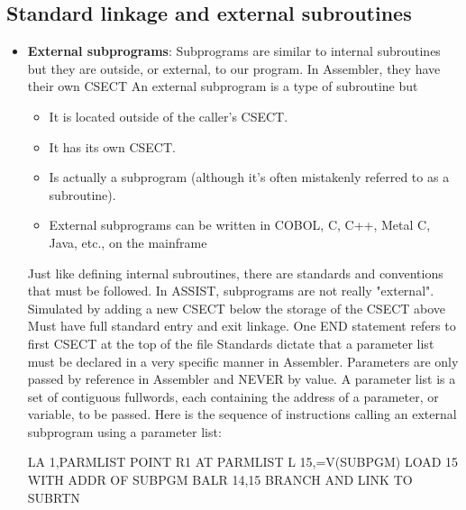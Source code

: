 \documentclass{report}
\begin{document}
    \pagebreak 
    \subsection{Standard linkage and external subroutines}
    \begin{itemize}
        \item \textbf{External subprograms}: Subprograms are similar to internal subroutines but they are outside, or external, to our program. 
            \bigbreak \noindent 
            In Assembler, they have their own CSECT
            \bigbreak \noindent 
            An external subprogram is a type of subroutine but
            \begin{itemize}
                \item It is located outside of the caller's CSECT.
                \item It has its own CSECT.
                \item Is actually a subprogram (although it's often mistakenly referred to as a subroutine).
                \item External subprograms can be written in COBOL, C, C++, Metal C, Java, etc., on the mainframe
            \end{itemize}
            \bigbreak \noindent 
            Just like defining internal subroutines, there are standards and conventions that must be followed.
            \bigbreak \noindent 
            In ASSIST, subprograms are not really "external". Simulated by adding a new CSECT below the storage of the CSECT above
            \bigbreak \noindent 
            Must have full standard entry and exit linkage. One END statement refers to first CSECT at the top of the file
            \bigbreak \noindent 
            Standards dictate that a parameter list must be declared in a very specific manner in Assembler. Parameters are only passed by reference in Assembler and NEVER by value.  A parameter list is a set of contiguous fullwords, each containing the address of a parameter, or variable, to be passed.
            \bigbreak \noindent 
            Here is the sequence of instructions calling an external subprogram using a parameter list:
            \bigbreak \noindent 
            \begin{cppcode}
                LA   1,PARMLIST    POINT R1 AT PARMLIST
                L    15,=V(SUBPGM) LOAD 15 WITH ADDR OF SUBPGM
                BALR 14,15         BRANCH AND LINK TO SUBRTN
            \end{cppcode}
            \bigbreak \noindent 

\end{itemize}
\end{document}
